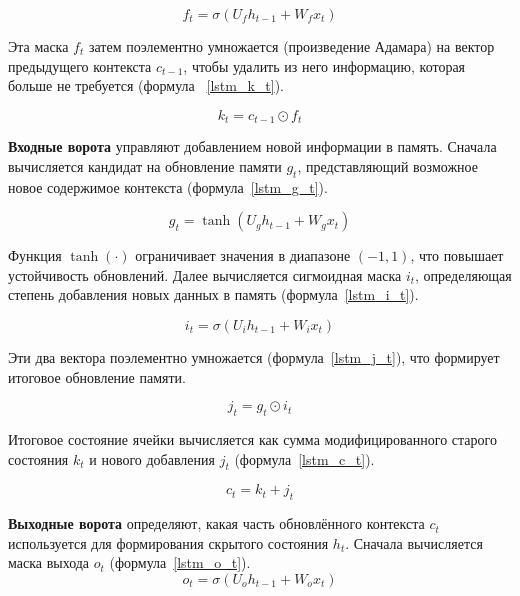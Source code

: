 \begin{equation}\label{lstm_f_t}
    f_t = \sigma(U_f h_{t-1} + W_f x_t)
\end{equation}

Эта маска $f_t$ затем поэлементно умножается (произведение Адамара) на вектор предыдущего контекста $c_{t-1}$, чтобы удалить из него информацию, которая больше не требуется (формула ~\ref{lstm_k_t}).

\begin{equation}\label{lstm_k_t}
    k_t = c_{t-1} \odot f_t
\end{equation}

\textbf{Входные ворота} управляют добавлением новой информации в память. Сначала вычисляется кандидат на обновление памяти $g_t$, представляющий возможное новое содержимое контекста (формула~\ref{lstm_g_t}).

\begin{equation}\label{lstm_g_t}
    g_t = \tanh(U_g h_{t-1} + W_g x_t)
\end{equation}

Функция $\tanh(\cdot)$ ограничивает значения в диапазоне $(-1, 1)$, что повышает устойчивость обновлений. Далее вычисляется сигмоидная маска $i_t$, определяющая степень добавления новых данных в память (формула~\ref{lstm_i_t}).

\begin{equation}\label{lstm_i_t}
    i_t = \sigma(U_i h_{t-1} + W_i x_t)
\end{equation}

Эти два вектора поэлементно умножается (формула~\ref{lstm_j_t}), что формирует итоговое обновление памяти.

\begin{equation}\label{lstm_j_t}
    j_t = g_t \odot i_t
\end{equation}

Итоговое состояние ячейки вычисляется как сумма модифицированного старого состояния $k_t$ и нового добавления $j_t$ (формула~\ref{lstm_c_t}).

\begin{equation}\label{lstm_c_t}
    c_t = k_t + j_t
\end{equation}

\textbf{Выходные ворота} определяют, какая часть обновлённого контекста $c_t$ используется для формирования скрытого состояния $h_t$. Сначала вычисляется маска выхода $o_t$ (формула~\ref{lstm_o_t}).
\nopagebreak
\begin{equation}\label{lstm_o_t}
    o_t = \sigma(U_o h_{t-1} + W_o x_t)
\end{equation}

